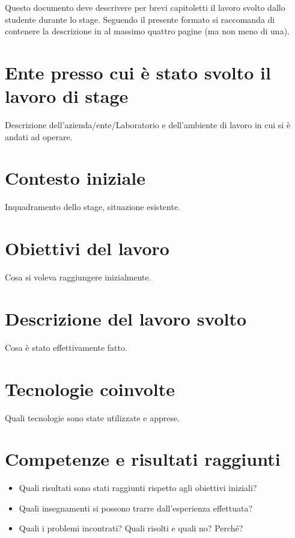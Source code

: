 \documentclass[a4paper, 12pt, italian]{extarticle}
\begin{document}
Questo documento deve descrivere per brevi capitoletti il lavoro svolto dallo studente durante lo stage.
Seguendo il presente formato si raccomanda di contenere la descrizione in al massimo quattro pagine (ma
non meno di una).

\section{Ente presso cui è stato svolto il lavoro di stage}
Descrizione dell’azienda/ente/Laboratorio e dell’ambiente di lavoro in cui si \`e andati ad operare.

\section{Contesto iniziale}
Inquadramento dello stage, situazione esistente.

\section{Obiettivi del lavoro}
Cosa si voleva raggiungere inizialmente.

\section{Descrizione del lavoro svolto}
Cosa \`e stato effettivamente fatto.

\section{Tecnologie coinvolte}
Quali tecnologie sono state utilizzate e apprese.

\section{Competenze e risultati raggiunti}
\begin{itemize}
	\item Quali risultati sono stati raggiunti rispetto agli obiettivi iniziali?
	\item Quali insegnamenti si possono trarre dall’esperienza effettuata?
	\item Quali i problemi incontrati? Quali risolti e quali no? Perch\'e?
\end{itemize}

\newpage

\section{\bibname}

\nocite{*}
\printbibliography[heading=none]
\end{document}
